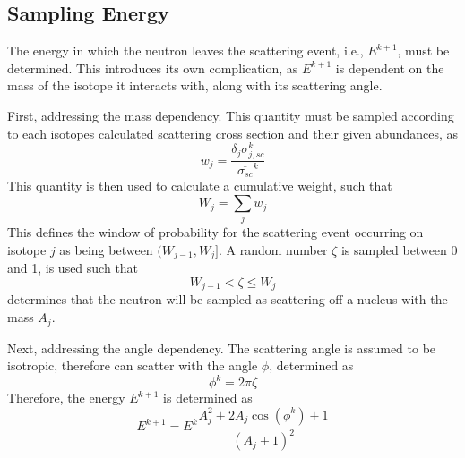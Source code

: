 \subsection{Sampling Energy}
\label{ssec:sampling-energy-ms}
The energy in which the neutron leaves the scattering event, i.e., $E^{k+1}$, must be determined. This introduces its own complication, as $E^{k+1}$ is dependent on the mass of the isotope it interacts with, along with its scattering angle. 

First, addressing the mass dependency. This quantity must be sampled according to each isotopes calculated scattering cross section and their given abundances, as
\begin{equation}
    w_{j} = \frac{\delta_j \sigma_{j,sc}^{k} }{\overline{\sigma_{sc}}^{k}}
\end{equation}
This quantity is then used to calculate a cumulative weight, such that
\begin{equation}
    W_j = \sum_{j} w_j
\end{equation}
This defines the window of probability for the scattering event occurring on isotope $j$ as being between $(W_{j-1}, W_{j}]$.
A random number $\zeta$ is sampled between 0 and 1, is used such that
\begin{equation}
    W_{j-1} < \zeta \leq W_{j}
\end{equation}
determines that the neutron will be sampled as scattering off a nucleus with the mass $A_j$.

Next, addressing the angle dependency. The scattering angle is assumed to be isotropic, therefore can scatter with the angle $\phi$, determined as
\begin{equation}
    \phi^k = 2\pi\zeta
\end{equation}
Therefore, the energy $E^{k+1}$ is determined as
\begin{equation}
    E^{k+1} = E^{k} \frac{A_j^{2} + 2A_{j}\cos{\left(\phi^{k}\right) + 1}}{\left( A_{j} + 1 \right)^2}
\end{equation}

